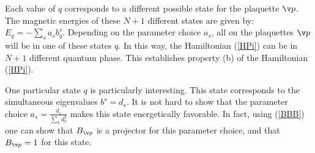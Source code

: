 \documentclass[aps,twocolumn,groupedaddress,showpacs,floatfix]{revtex4}
\begin{document}
Each value of $q$ corresponds to a different possible state for the plaquette 
$\v p$. The magnetic energies of these $N+1$ different states are given by:
$E_q = -\sum_{s} a_s b^s_q$. Depending on the parameter choice $a_s$, all
on the plaquettes $\v p$ will be in one of these states $q$. In this way, the 
Hamiltonian (\ref{HPi}) can be in $N+1$ different quantum phase. This 
establishes property (b) of the Hamiltonian (\ref{HPi}).

One particular state $q$ is particularly interesting. This state corresponds
to the simultaneous eigenvalues $b^{s} = d_{s}$. It is not hard to show 
that the parameter choice $a_s = \frac{d_s}{\sum_k d_k^2}$ makes this
state energetically favorable. In fact, using (\ref{BBB}) one can show that
$B_{\v p}$ is a projector for this parameter choice, and that $B_{\v p} = 1$
for this state. 
\end{document}
